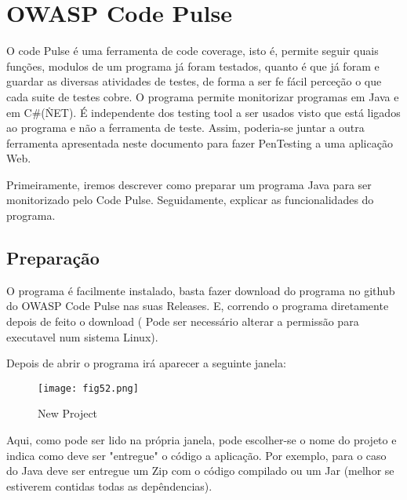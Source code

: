 \section{OWASP Code Pulse}
\par O code Pulse é uma ferramenta de code coverage, isto é, permite seguir quais funções, modulos de um programa já foram testados, quanto é que já foram e guardar as diversas atividades de testes, de forma a ser fe fácil perceção o que cada suite de testes cobre. O programa permite monitorizar programas em Java e em C\#(\.NET). É independente dos testing tool a ser usados visto que está ligados ao programa e não a ferramenta de teste. Assim, poderia-se juntar a outra ferramenta apresentada neste documento para fazer PenTesting a uma aplicação Web.
\par Primeiramente, iremos descrever como preparar um programa Java para ser monitorizado pelo Code Pulse. Seguidamente, explicar as funcionalidades do programa.
\subsection{Preparação}
\par O programa é facilmente instalado, basta fazer download do programa no github do OWASP Code Pulse nas suas Releases. E, correndo o programa diretamente depois de feito o download ( Pode ser necessário alterar a permissão para executavel num sistema Linux).
\par Depois de abrir o programa irá aparecer a seguinte janela:
\begin{figure}[H]

  \centering

  \texttt{[image: fig52.png]}

  \caption{New Project}

\end{figure}
Aqui, como pode ser lido na própria janela, pode escolher-se o nome do projeto e indica como deve ser "entregue" o código a aplicação. Por exemplo, para o caso do Java deve ser entregue um Zip com o código compilado ou um Jar (melhor se estiverem contidas todas as depêndencias).

